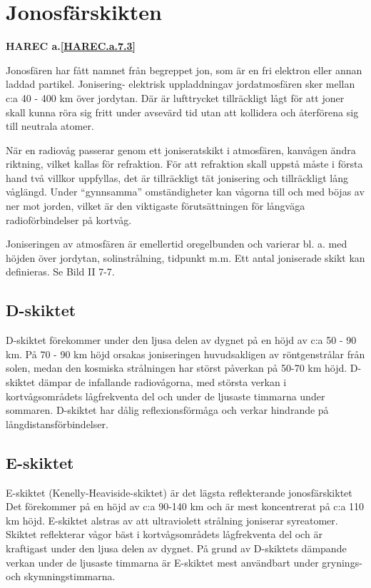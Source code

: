 \section{Jonosfärskikten}
\textbf{
HAREC a.\ref{HAREC.a.7.3}\label{myHAREC.a.7.3}
}

Jonosfären har fått namnet från begreppet jon, som är en fri elektron
eller annan laddad partikel. Jonisering- elektrisk uppladdningav
jordatmosfären sker mellan c:a 40 - 400 km över jordytan. Där är
lufttrycket tillräckligt lågt för att joner skall kunna röra sig fritt
under avsevärd tid utan att kollidera och återförena sig till neutrala
atomer.

När en radiovåg passerar genom ett joniseratskikt i atmosfären,
kanvågen ändra riktning, vilket kallas för refraktion. För att
refraktion skall uppstå måste i första hand två villkor uppfyllas, det
är tillräckligt tät jonisering och tillräckligt lång våglängd. Under
``gynnsamma'' omständigheter kan vågorna till och med böjas av ner mot
jorden, vilket är den viktigaste förutsättningen för långväga
radioförbindelser på kortvåg.

Joniseringen av atmosfären är emellertid oregelbunden och varierar
bl. a. med höjden över jordytan, solinstrålning, tidpunkt m.m.  Ett
antal joniserade skikt kan definieras.  Se Bild II 7-7.

\subsection{D-skiktet}

D-skiktet förekommer under den ljusa delen av dygnet på en höjd av c:a
50 - 90 km. På 70 - 90 km höjd orsakas joniseringen huvudsakligen av
röntgenstrålar från solen, medan den kosmiska strålningen har störst
påverkan på 50-70 km höjd. D-skiktet dämpar de infallande
radiovågorna, med största verkan i kortvågsområdets lågfrekventa del
och under de ljusaste timmarna under sommaren.  D-skiktet har dålig
reflexionsförmåga och verkar hindrande på långdistansförbindelser.

\subsection{E-skiktet}

E-skiktet (Kenelly-Heaviside-skiktet) är det lägsta reflekterande
jonosfärskiktet Det förekommer på en höjd av c:a 90-140 km och är mest
koncentrerat på c:a 110 km höjd. E-skiktet alstras av att ultraviolett
strålning joniserar syreatomer. Skiktet reflekterar vågor bäst i
kortvågsområdets lågfrekventa del och är kraftigast under den ljusa
delen av dygnet. På grund av D-skiktets dämpande verkan under de
ljusaste timmarna är E-skiktet mest användbart under grynings- och
skymningstimmarna.

